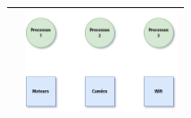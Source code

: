 \documentclass[12pt,a4paper,article,english,firamath]{nsi}
\newcommand{\truc}{4.5cm}
\begin{document}
\begin{center}
\begin{tabular}{|c|c|}
\hline
 & \includegraphics[width=\truc]{img/d6.png} \\
\hline
 \end{tabular}
\end{center}
\newpage
\end{document}
